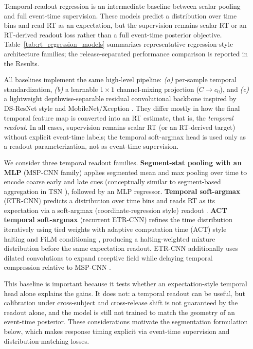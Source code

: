 \documentclass[12pt]{article}
\begin{document}
Temporal-readout regression is an intermediate baseline between scalar pooling and full event-time supervision. These models predict a distribution over time bins and read RT as an expectation, but the supervision remains scalar RT or an RT-derived readout loss rather than a full event-time posterior objective. Table~\ref{tab:rt_regression_models} summarizes representative regression-style architecture families; the release-separated performance comparison is reported in the Results.

All baselines implement the same high-level pipeline: \emph{(a)} per-sample temporal standardization,
\emph{(b)} a learnable $1{\times}1$ channel-mixing projection ($C \!\rightarrow\! c_0$), and \emph{(c)} a lightweight
depthwise-separable residual convolutional backbone inspired by DS-ResNet style and MobileNet/Xception
\citep{howard2017mobilenets,chollet2017xception}. They differ mostly in how the final temporal feature map is converted into an RT estimate, that is, the \emph{temporal readout}.
In all cases, supervision remains scalar RT (or an RT-derived target) without explicit event-time labels; the temporal soft-argmax head is used only as a readout parameterization, not as event-time supervision.

We consider three temporal readout families. \textbf{Segment-stat pooling with an MLP} (MSP-CNN family) applies segmented mean and max
pooling over time to encode coarse early and late cues (conceptually similar to segment-based aggregation in TSN
\citep{wang2016tsn}), followed by an MLP regressor. \textbf{Temporal soft-argmax} (ETR-CNN) predicts a distribution
over time bins and reads RT as its expectation via a soft-argmax (coordinate-regression style) readout
\citep{nibali2018dsnt}. \textbf{ACT temporal soft-argmax} (recurrent ETR-CNN) refines the time distribution iteratively using tied
weights with adaptive computation time (ACT) style halting \citep{graves2016act} and FiLM conditioning \citep{perez2018film},
producing a halting-weighted mixture distribution before the same expectation readout. 
ETR-CNN additionally uses dilated convolutions to expand receptive field while delaying temporal compression relative to MSP-CNN \citep{yu2016dilated}.

This baseline is important because it tests whether an expectation-style temporal head alone explains the gains. It does not: a temporal readout can be useful, but calibration under cross-subject and cross-release shift is not guaranteed by the readout alone, and the model is still not trained to match the geometry of an event-time posterior. These considerations motivate the segmentation formulation below, which makes response timing explicit via event-time supervision and distribution-matching losses.
\end{document}
